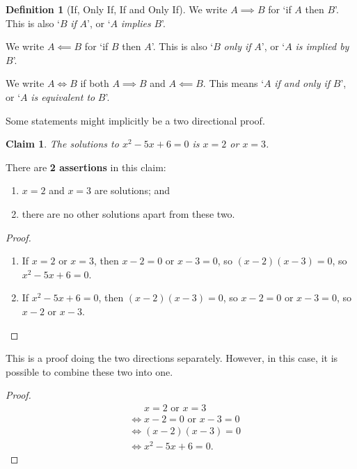 \documentclass{article}
\newtheorem{claim}[theorem]{Claim}
\theoremstyle{definition}
\newtheorem{definition}[theorem]{Definition}
\theoremstyle{remark}
\newcommand{\pqty}[1]{\left(#1\right)}
\begin{document}
\begin{definition}[If, Only If, If and Only If]
    We write \(A \implies B\) for `if \(A\) then \(B\)'. This is also `\(B\) \emph{if} \(A\)', or `\(A\) \emph{implies} \(B\)'.

    We write \(A \impliedby B\) for `if \(B\) then \(A\)'. This is also `\(B\) \emph{only if} \(A\)', or `\(A\) \emph{is implied by} \(B\)'.

    We write \(A \iff B\) if both \(A \implies B\) and \(A \impliedby B\). This means `\(A\) \emph{if and only if} \(B\)', or `\(A\) \emph{is equivalent to} \(B\)'.
\end{definition}

Some statements might implicitly be a two directional proof.

\begin{claim}
    The solutions to \(x^2 - 5x + 6 = 0\) is \(x = 2\) or \(x = 3\).
\end{claim}

There are \textbf{2 assertions} in this claim:
\begin{enumerate}
    \item \(x = 2\) and \(x = 3\) are solutions; and
    \item there are no other solutions apart from these two.
\end{enumerate}

\begin{proof}
    \begin{enumerate}
        \item If \(x = 2\) or \(x = 3\), then \(x - 2 = 0\) or \(x - 3 = 0\), so \(\pqty{x - 2} \pqty{x - 3} = 0\), so \(x^2 - 5x + 6 = 0\).
        \item If \(x^2 - 5x + 6 = 0\), then \(\pqty{x - 2} \pqty{x - 3} = 0\), so \(x - 2 = 0\) or \(x - 3 = 0\), so \(x - 2\) or \(x - 3\).
    \end{enumerate}
\end{proof}

This is a proof doing the two directions separately. However, in this case, it is possible to combine these two into one.

\begin{proof}
    \begin{align*}
        &\phantom{\iff} x = 2 \text{ or } x = 3 \\
        &\iff x - 2 = 0 \text{ or } x - 3 = 0 \\
        &\iff \pqty{x - 2} \pqty{x - 3} = 0 \\
        &\iff x^2 - 5x + 6 = 0.
    \end{align*}
\end{proof}
\end{document}
